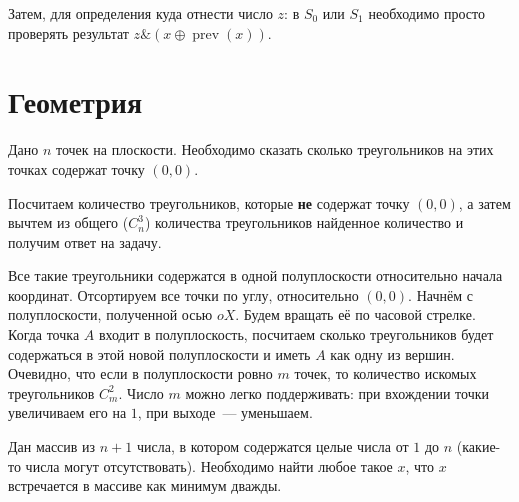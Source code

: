 \documentclass[addpoints]{exam}
\DeclareMathOperator{\prev}{prev}
\begin{document}
\begin{questions}
\begin{solution}
Затем, для определения куда отнести число $z$: в $S_0$ или $S_1$ необходимо просто проверять результат $z \& (x \oplus \prev(x))$.

\end{solution}


\section{Геометрия}

\question Дано $n$ точек на плоскости. Необходимо сказать сколько треугольников на этих точках содержат точку $(0,0)$. 


\begin{solution}

Посчитаем количество треугольников, которые \textbf{не} содержат точку $(0,0)$, а затем вычтем из общего ($C_n^3$) количества треугольников найденное количество и получим ответ на задачу.

Все такие треугольники содержатся в одной полуплоскости относительно начала координат. Отсортируем все точки по углу, относительно $(0,0)$. Начнём с полуплоскости, полученной осью $oX$. Будем вращать её по часовой стрелке. Когда точка $A$ входит в полуплоскость, посчитаем сколько треугольников будет содержаться в этой новой полуплоскости и иметь $A$ как одну из вершин. Очевидно, что если в полуплоскости ровно $m$ точек, то количество искомых треугольников $C_m^2$. Число $m$ можно легко поддерживать: при вхождении точки увеличиваем его на $1$, при выходе~--- уменьшаем.

\end{solution}

\question[3] Дан массив из $n+1$ числа, в котором содержатся целые числа от $1$ до $n$ (какие-то числа могут отсутствовать). Необходимо найти любое такое $x$, что $x$ встречается в массиве как минимум дважды.


\end{questions}
\end{document}
